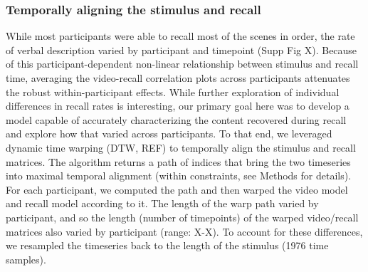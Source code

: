 \documentclass[a4paper,man,natbib,floatsintext]{apa6}
\begin{document}
\subsubsection{Temporally aligning the stimulus and recall}
While most participants were able to recall most of the scenes in order, the rate of verbal description varied by participant and timepoint (Supp Fig X). Because of this participant-dependent non-linear relationship between stimulus and recall time, averaging the video-recall correlation plots across participants attenuates the robust within-participant effects. While further exploration of individual differences in recall rates is interesting, our primary goal here was to develop a model capable of accurately characterizing the content recovered during recall and explore how that varied across participants.  To that end, we leveraged dynamic time warping (DTW, REF) to temporally align the stimulus and recall matrices.  The algorithm returns a path of indices that bring the two timeseries into maximal temporal alignment (within constraints, see Methods for details).  For each participant, we computed the path and then warped the video model and recall model according to it. The length of the warp path varied by participant, and so the length (number of timepoints) of the warped video/recall matrices also varied by participant (range: X-X). To account for these differences, we resampled the timeseries back to the length of the stimulus (1976 time samples).
\end{document}
